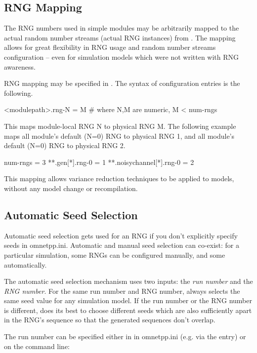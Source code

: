 \subsection{RNG Mapping}

The RNG numbers used in simple modules may be arbitrarily mapped to the
actual random number streams (actual RNG instances) from .
The mapping allows for great flexibility in RNG usage and random number
streams configuration -- even for simulation models which were not
written with RNG awareness.

RNG mapping may be specified in . The syntax of
configuration entries is the following.

\begin{inifile}
[General]
<modulepath>.rng-N = M  # where N,M are numeric, M < num-rngs
\end{inifile}

This maps module-local RNG N to physical RNG M. The following
example maps all  module's default (N=0) RNG to physical RNG 1,
and all  module's default (N=0) RNG to physical RNG 2.

\begin{inifile}
[General]
num-rngs = 3
**.gen[*].rng-0 = 1
**.noisychannel[*].rng-0 = 2
\end{inifile}

This mapping allows variance reduction techniques to be applied to
{\opp} models, without any model change or recompilation.


\subsection{Automatic Seed Selection}

Automatic seed selection gets used for an RNG if you don't explicitly
specify seeds in omnetpp.ini. Automatic and manual seed selection can
co-exist: for a particular simulation, some RNGs can be configured
manually, and some automatically.

The automatic seed selection mechanism uses two inputs: the \textit{run number}
 and the \textit{RNG number}. For the same run number and RNG number,
{\opp} always selects the same seed value for any simulation model.
If the run number or the RNG number is different, {\opp} does its best
to choose different seeds which are also sufficiently apart in the RNG's sequence
so that the generated sequences don't overlap.

The run number can be specified either in in omnetpp.ini (e.g. via the
 entry) or on the command line:

